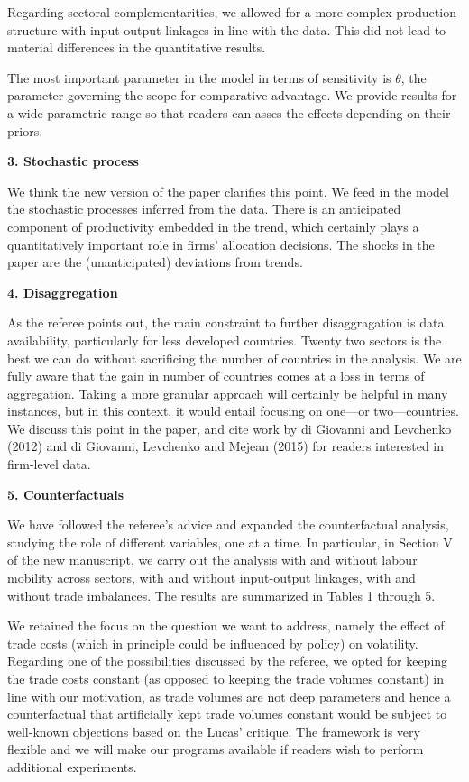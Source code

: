 \documentclass[12pt]{article}
\begin{document}
Regarding sectoral complementarities, we allowed for a more complex
production structure with input-output linkages in line with the data. This
did not lead to material differences in the quantitative results.

The most important parameter in the model in terms of sensitivity is $\theta 
$, the parameter governing the scope for comparative advantage. We provide
results for a wide parametric range so that readers can asses the effects
depending on their priors.\bigskip

\textbf{3. Stochastic process}

We think the new version of the paper clarifies this point. We feed in the
model the stochastic processes inferred from the data. There is an
anticipated component of productivity embedded in the trend, which certainly
plays a quantitatively important role in firms' allocation decisions. The
shocks in the paper are the (unanticipated) deviations from trends.\bigskip

\textbf{4. Disaggregation}

As the referee points out, the main constraint to further disaggragation is
data availability, particularly for less developed countries. Twenty two
sectors is the best we can do without sacrificing the number of countries in
the analysis. We are fully aware that the gain in number of countries comes
at a loss in terms of aggregation. Taking a more granular approach will
certainly be helpful in many instances, but in this context, it would entail
focusing on one---or two---countries. We discuss this point in the paper,
and cite work by di Giovanni and Levchenko (2012) and di Giovanni, Levchenko
and Mejean (2015) for readers interested in firm-level data.\bigskip

\textbf{5. Counterfactuals}

We have followed the referee's advice and expanded the counterfactual
analysis, studying the role of different variables, one at a time. In
particular, in Section V of the new manuscript, we carry out the analysis
with and without labour mobility across sectors, with and without
input-output linkages, with and without trade imbalances. The results are
summarized in Tables 1 through 5.

We retained the focus on the question we want to address, namely the effect
of trade costs (which in principle could be influenced by policy) on
volatility. Regarding one of the possibilities discussed by the referee, we
opted for keeping the trade costs constant (as opposed to keeping the trade
volumes constant) in line with our motivation, as trade volumes are not deep
parameters and hence a counterfactual that artificially kept trade volumes
constant would be subject to well-known objections based on the Lucas'
critique. The framework is very flexible and we will make our programs
available if readers wish to perform additional experiments.\bigskip
\end{document}

